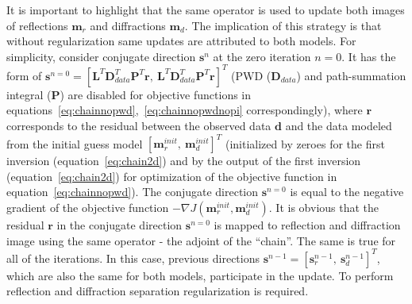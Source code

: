 It is important to highlight that the same operator is used to update both images of reflections $\mathbf{m}_r$ and
diffractions $\mathbf{m}_d$. The implication of this strategy is that without regularization same updates are attributed to both models. For simplicity, consider conjugate direction $\mathbf{s}^{n}$ at the zero iteration $n=0$. It has the form of $\mathbf{s}^{n=0}=[\mathbf{L}^T\mathbf{D}_{data}^T\mathbf{P}^T\mathbf{r},\ \mathbf{L}^T\mathbf{D}_{data}^T\mathbf{P}^T\mathbf{r}]^T$
(PWD ($\mathbf{D}_{data}$) and path-summation integral ($\mathbf{P}$) are disabled for objective functions in equations~\ref{eq:chainnopwd},~\ref{eq:chainnopwdnopi} correspondingly), where
$\mathbf{r}$ corresponds to the residual between the observed data $\mathbf{d}$ and the data modeled from the initial guess model
$[\mathbf{m}_{r}^{init},\ \mathbf{m}_{d}^{init}]^T$ (initialized by zeroes for the first inversion (equation~\ref{eq:chain2d})
and by the output of the first inversion (equation~\ref{eq:chain2d}) for optimization of the objective function in equation~\ref{eq:chainnopwd}).
The conjugate direction $\mathbf{s}^{n=0}$ is equal to the negative gradient of the objective function $-\nabla J(\mathbf{m}_{r}^{init},\mathbf{m}_{d}^{init})$.
It is obvious that the residual $\mathbf{r}$ in the conjugate direction $\mathbf{s}^{n=0}$ is mapped to reflection and diffraction image using the same operator - the
adjoint of the ``chain''. The same is true for all of the iterations. In this case, previous directions
$\mathbf{s}^{n-1} = [\mathbf{s}_r^{n-1},\ \mathbf{s}_d^{n-1}]^T$, which are also the same for both models, participate in the update. To perform reflection and diffraction
separation regularization is required. 

